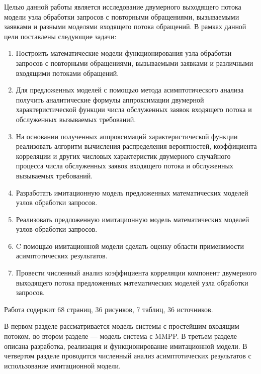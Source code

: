 Целью данной работы является исследование двумерного выходящего потока модели узла обработки запросов с повторными обращениями, вызываемыми заявками и разными моделями входящего потока обращений. В рамках данной цели поставлены следующие задачи:
\begin{enumerate}
	\item Построить математические модели функционирования узла обработки запросов с повторными обращениями, вызываемыми заявками и различными входящими потоками обращений.
	\item Для предложенных моделей с помощью метода асимптотического анализа получить аналитические формулы аппроксимации двумерной характеристической функции числа обслуженных заявок входящего потока и обслуженных вызываемых требований. 
	\item На основании полученных аппроксимаций характеристической функции реализовать алгоритм вычисления распределения вероятностей, коэффициента корреляции и других числовых характеристик двумерного случайного процесса числа обслуженных заявок входящего потока и обслуженных вызываемых требований.
	\item Разработать имитационную модель предложенных математических моделей узлов обработки запросов.
	\item Реализовать предложенную имитационную модель математических моделей узлов обработки запросов.
	\item C помощью имитационной модели сделать оценку области применимости асимптотических результатов.
	\item Провести численный анализ коэффициента корреляции компонент двумерного выходящего потока предложенных математических моделей узла обработки запросов.
\end{enumerate}

Работа содержит 68 страниц, 36 рисунков, 7 таблиц, 36 источников.

В первом разделе рассматривается модель системы с простейшим входящим потоком, во втором разделе --- модель система с MMPP. В третьем разделе описана разработка, реализация и функционирование имитационной модели. В четвертом разделе проводится численный анализ асимптотических результатов с использование имитационной модели.

 \clearpage